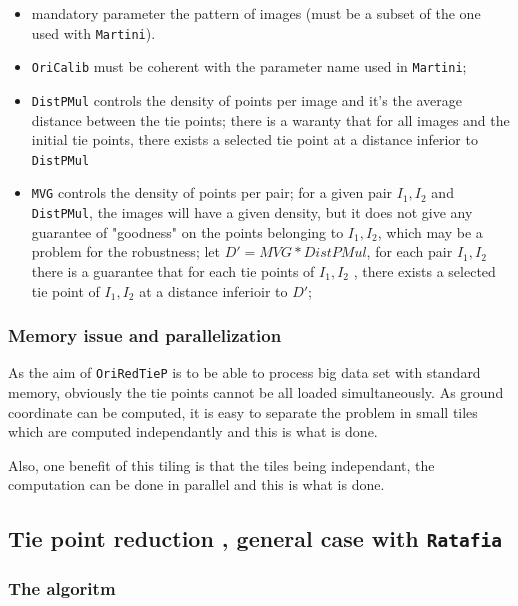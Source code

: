 \begin{itemize}
   \item mandatory parameter the pattern of images (must be a subset of the one used with {\tt Martini}).
   \item  {\tt OriCalib} must be coherent with the parameter name used in {\tt Martini};
   \item  {\tt DistPMul} controls the density of points per image and it's the average distance between the
          tie points; there is a waranty that for all images and the initial tie points, there exists
          a selected tie point at a distance inferior to  {\tt DistPMul}
   \item  {\tt MVG} controls the density of points per pair; for a given pair $I_1,I_2$ and 
          {\tt DistPMul}, the images will have a given density, but it does not give any guarantee of "goodness"
          on the points belonging to $I_1,I_2$, which may be a problem for the robustness;
          let $D'=MVG*DistPMul$, for each pair $I_1,I_2$   there is a guarantee 
          that for each tie points of $I_1,I_2$ , there exists
          a selected tie point of $I_1,I_2$ at a distance inferioir to  $D'$;
\end{itemize}



\subsubsection{Memory issue and parallelization}


As the aim of {\tt OriRedTieP} is to be able to process big data set with standard memory,
obviously the tie points cannot be all loaded simultaneously. As ground coordinate can be
computed, it is easy to separate the problem in small tiles which are computed independantly
and this is what is done.

Also, one benefit of this tiling is that the tiles being independant, the computation can
be done in parallel and this is what is done.



\subsection{Tie point reduction , general case with {\tt Ratafia}}

\subsubsection{The algoritm}


